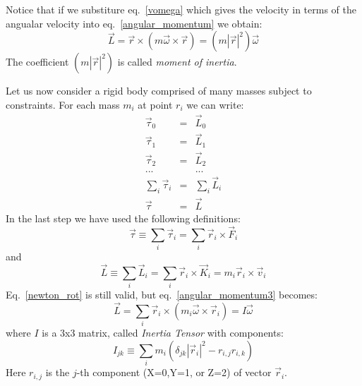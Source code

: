 \documentclass[12pt]{article}
\begin{document}
Notice that if we substiture eq.~\ref{vomega} which gives the velocity in terms of the angualar velocity into eq.~\ref{angular_momentum} we obtain:
\begin{equation}
\vec L = \vec r \times (m \vec \omega \times \vec r) = (m |\vec r|^2) \vec \omega
\label{angular_momentum2}
\end{equation}
The coefficient $(m |\vec r|^2)$ is called {\it moment of inertia}.

Let us now consider a rigid body comprised of many masses subject to constraints. For each mass $m_i$ at point $r_i$ we can write:
\begin{eqnarray}
  \vec \tau_0 &=& \vec L_0 \\
  \vec \tau_1 &=& \vec L_1 \\
  \vec \tau_2 &=& \vec L_2 \\
  ... && ... \\
  \sum_i \vec \tau_i &=& \sum_i \vec L_i \\
  \vec \tau &=& \vec L
\end{eqnarray}
In the last step we have used the following definitions:
\begin{equation}
\vec \tau \equiv \sum_i \vec \tau_i = \sum_i \vec r_i \times \vec F_i
\end{equation}
and
\begin{equation}
\vec L \equiv \sum_i \vec L_i = \sum_i \vec r_i \times \vec K_i = m_i  \vec r_i \times \vec v_i
\label{angular_momentum3}
\end{equation}
Eq.~\ref{newton_rot} is still valid, but eq.~\ref{angular_momentum3} becomes:
\begin{equation}
\vec L = \sum _i \vec r_i \times (m_i \vec \omega \times \vec r_i) = I \vec \omega
\label{angular_momentum4}
\end{equation}
where $I$ is a 3x3 matrix, called {\it Inertia Tensor} with components:
\begin{equation}
I_{jk} \equiv \sum_i m_i (\delta_{jk} |\vec r_i|^2 - r_{i,j} r_{i,k})
\label{momentum_inertia}
\end{equation}
Here $r_{i,j}$ is the $j$-th component (X=0,Y=1, or Z=2) of vector $\vec r_i$.
\end{document}
